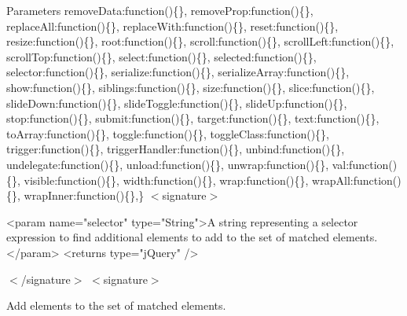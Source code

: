 \begin{DoxyParams}{Parameters}
\textquotesingle{}remove\+Data\textquotesingle{}\+:function()\{\}, \textquotesingle{}remove\+Prop\textquotesingle{}\+:function()\{\}, \textquotesingle{}replace\+All\textquotesingle{}\+:function()\{\}, \textquotesingle{}replace\+With\textquotesingle{}\+:function()\{\}, \textquotesingle{}reset\textquotesingle{}\+:function()\{\}, \textquotesingle{}resize\textquotesingle{}\+:function()\{\}, \textquotesingle{}root\textquotesingle{}\+:function()\{\}, \textquotesingle{}scroll\textquotesingle{}\+:function()\{\}, \textquotesingle{}scroll\+Left\textquotesingle{}\+:function()\{\}, \textquotesingle{}scroll\+Top\textquotesingle{}\+:function()\{\}, \textquotesingle{}select\textquotesingle{}\+:function()\{\}, \textquotesingle{}selected\textquotesingle{}\+:function()\{\}, \textquotesingle{}selector\textquotesingle{}\+:function()\{\}, \textquotesingle{}serialize\textquotesingle{}\+:function()\{\}, \textquotesingle{}serialize\+Array\textquotesingle{}\+:function()\{\}, \textquotesingle{}show\textquotesingle{}\+:function()\{\}, \textquotesingle{}siblings\textquotesingle{}\+:function()\{\}, \textquotesingle{}size\textquotesingle{}\+:function()\{\}, \textquotesingle{}slice\textquotesingle{}\+:function()\{\}, \textquotesingle{}slide\+Down\textquotesingle{}\+:function()\{\}, \textquotesingle{}slide\+Toggle\textquotesingle{}\+:function()\{\}, \textquotesingle{}slide\+Up\textquotesingle{}\+:function()\{\}, \textquotesingle{}stop\textquotesingle{}\+:function()\{\}, \textquotesingle{}submit\textquotesingle{}\+:function()\{\}, \textquotesingle{}target\textquotesingle{}\+:function()\{\}, \textquotesingle{}text\textquotesingle{}\+:function()\{\}, \textquotesingle{}to\+Array\textquotesingle{}\+:function()\{\}, \textquotesingle{}toggle\textquotesingle{}\+:function()\{\}, \textquotesingle{}toggle\+Class\textquotesingle{}\+:function()\{\}, \textquotesingle{}trigger\textquotesingle{}\+:function()\{\}, \textquotesingle{}trigger\+Handler\textquotesingle{}\+:function()\{\}, \textquotesingle{}unbind\textquotesingle{}\+:function()\{\}, \textquotesingle{}undelegate\textquotesingle{}\+:function()\{\}, \textquotesingle{}unload\textquotesingle{}\+:function()\{\}, \textquotesingle{}unwrap\textquotesingle{}\+:function()\{\}, \textquotesingle{}val\textquotesingle{}\+:function()\{\}, \textquotesingle{}visible\textquotesingle{}\+:function()\{\}, \textquotesingle{}width\textquotesingle{}\+:function()\{\}, \textquotesingle{}wrap\textquotesingle{}\+:function()\{\}, \textquotesingle{}wrap\+All\textquotesingle{}\+:function()\{\}, \textquotesingle{}wrap\+Inner\textquotesingle{}\+:function()\{\},\} $<$signature$>$ \begin{DoxyVerb}<param name="selector" type="String">A string representing a selector expression to find additional elements to add to the set of matched elements.</param>
<returns type="jQuery" />
\end{DoxyVerb}
 $<$/signature$>$ $<$signature$>$ \\
\hline
\end{DoxyParams}
Add elements to the set of matched elements.


